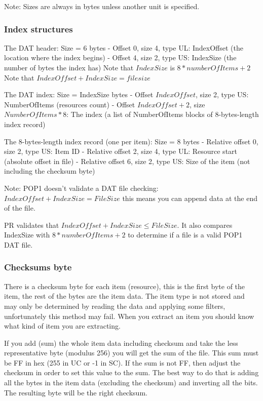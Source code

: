 \documentclass{article}
\begin{document}
 Note: Sizes are always in bytes unless another unit is specified.\\

\subsubsection{Index structures}

 The  DAT header: Size = 6 bytes
  - Offset 0, size 4, type UL: IndexOffset
           (the location where the index begins)
  - Offset 4, size 2, type US: IndexSize
           (the number of bytes the index has)
           Note that $IndexSize$ is $8*numberOfItems+2$
           Note that $IndexOffset+IndexSize=file size$

 The DAT index: Size = IndexSize bytes
  - Offset $IndexOffset$,   size 2, type US: NumberOfItems
           (resources count)
  - Offset $IndexOffset+2$, size $NumberOfItems*8$: The index
           (a list of NumberOfItems blocks of 8-bytes-length index record)

 The 8-bytes-length index record (one per item): Size = 8 bytes
  - Relative offset 0, size 2, type US: Item ID
  - Relative offset 2, size 4, type UL: Resource start
           (absolute offset in file)
  - Relative offset 6, size 2, type US: Size of the item
           (not including the checksum byte)

 Note:
  POP1 doesn't validate a DAT file checking:
  $IndexOffset+IndexSize=FileSize$
  this means you can append data at the end of the file.

  PR validates that $IndexOffset+IndexSize \le FileSize$.
 It also compares IndexSize with $8*numberOfItems+2$ to determine if a file
  is a valid POP1 DAT file.

\subsubsection{Checksums byte}

 There is a  checksum byte for each item (resource), this is the first byte
 of the item, the rest of the bytes are the item data. The item type is not
 stored and may only be determined by reading the data and applying some
 filters, unfortunately this method may fail. When you extract an item you
 should know what kind of item you are extracting.

 If you add (sum) the whole item data including checksum and take the less
 representative byte (modulus 256) you will get the sum of the file. This
 sum must be FF in hex (255 in UC or -1 in SC). If the sum is not FF, then
 adjust the checksum in order to set this value to the sum. The best way
 to do that is adding all the bytes in the item data (excluding the
 checksum) and inverting all the bits. The resulting byte will be the
 right checksum.
\end{document}
